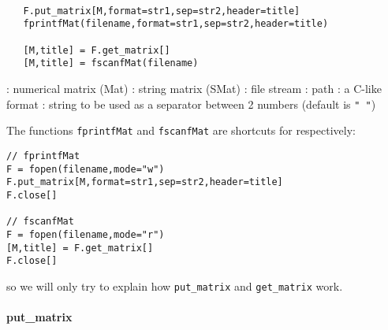 

\begin{mandesc}
  \\
  \\
  \\
\end{mandesc}
\label{print}
\begin{calling_sequence}
\begin{verbatim}
   F.put_matrix[M,format=str1,sep=str2,header=title]
   fprintfMat(filename,format=str1,sep=str2,header=title)

   [M,title] = F.get_matrix[]
   [M,title] = fscanfMat(filename)
\end{verbatim}
\end{calling_sequence}

\begin{parameters}
  \begin{varlist}
    : numerical matrix (Mat)
    : string matrix (SMat)
    : file stream
    : path
    : a C-like format
    : string to be used as a separator between 2 numbers (default is \verb+" "+)
  \end{varlist}
\end{parameters}

\begin{mandescription}
 The functions \verb+fprintfMat+ and \verb+fscanfMat+ are shortcuts for respectively:
\begin{Verbatim}
// fprintfMat
F = fopen(filename,mode="w")
F.put_matrix[M,format=str1,sep=str2,header=title]
F.close[]

// fscanfMat
F = fopen(filename,mode="r")
[M,title] = F.get_matrix[]
F.close[]
\end{Verbatim}
so we will only try to explain how \verb+put_matrix+ and \verb+get_matrix+ work.
\end{mandescription}

\paragraph{put\_matrix}

